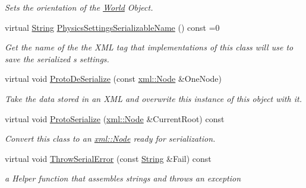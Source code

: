 \begin{DoxyCompactItemize}
\begin{DoxyCompactList}\small\item\em Sets the orientation of the \hyperlink{classMezzanine_1_1World}{World} Object. \item\end{DoxyCompactList}\item 
virtual \hyperlink{namespaceMezzanine_acf9fcc130e6ebf08e3d8491aebcf1c86}{String} \hyperlink{classMezzanine_1_1NonStaticWorldObject_a1e1decda1e208587eeafa90e3f185c01}{PhysicsSettingsSerializableName} () const =0
\begin{DoxyCompactList}\small\item\em Get the name of the the XML tag that implementations of this class will use to save the serialized s settings. \item\end{DoxyCompactList}\item 
virtual void \hyperlink{classMezzanine_1_1NonStaticWorldObject_a099e9ba0ce5980b3d1af9784f4bdb155}{ProtoDeSerialize} (const \hyperlink{classMezzanine_1_1xml_1_1Node}{xml::Node} \&OneNode)
\begin{DoxyCompactList}\small\item\em Take the data stored in an XML and overwrite this instance of this object with it. \item\end{DoxyCompactList}\item 
virtual void \hyperlink{classMezzanine_1_1NonStaticWorldObject_a8ea65216bedac69ad8105f39d952f738}{ProtoSerialize} (\hyperlink{classMezzanine_1_1xml_1_1Node}{xml::Node} \&CurrentRoot) const 
\begin{DoxyCompactList}\small\item\em Convert this class to an \hyperlink{classMezzanine_1_1xml_1_1Node}{xml::Node} ready for serialization. \item\end{DoxyCompactList}\item 
virtual void \hyperlink{classMezzanine_1_1NonStaticWorldObject_a1e1300809a35fe8263928ce890e1f91a}{ThrowSerialError} (const \hyperlink{namespaceMezzanine_acf9fcc130e6ebf08e3d8491aebcf1c86}{String} \&Fail) const 
\begin{DoxyCompactList}\small\item\em a Helper function that assembles strings and throws an exception \item\end{DoxyCompactList}\end{DoxyCompactItemize}


